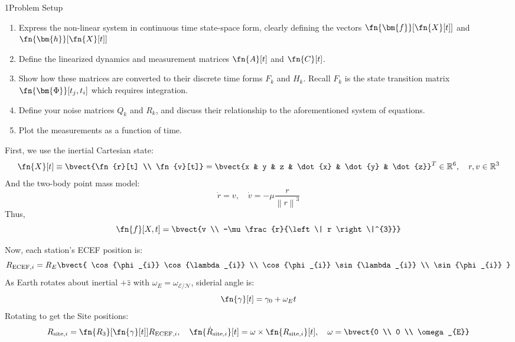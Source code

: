 \begin{hwkProblem}{1}{Problem Setup} \label{hwk:p01}

	\begin{enumerate}[label=\alph*.]
		\item \label{hwk:p01a} Express the non-linear system in continuous time state-space form, clearly defining the vectors \( \fn{\bm{f}}[\fn{X}[t]] \) and \( \fn{\bm{h}}[\fn{X}[t]] \)
		\item \label{hwk:p01b} Define the linearized dynamics and measurement matrices \( \fn{A}[t] \) and \( \fn{C}[t] \).
		\item \label{hwk:p01c} Show how these matrices are converted to their discrete time forms \( F_{k} \) and \( H_{k} \). Recall \( F_{k} \) is the state transition matrix \( \fn{\bm{\Phi}}[t_{j}, t_{i}] \) which requires integration.
		\item \label{hwk:p01d} Define your noise matrices \( Q_{k} \) and \( R_{k} \), and discuss their relationship to the aforementioned system of equations.
		\item \label{hwk:p01e} Plot the measurements as a function of time.
	\end{enumerate}

	\hwkSol{} \label{hwk:s01}

	\hwkPart{} \label{hwk:s01a}

	First, we use the inertial Cartesian state:
	\[
		\fn{X}[t] \equiv \bvect{\fn{r}[t] \\ \fn{v}[t]} = \bvect{x & y & z & \dot{x} & \dot{y} & \dot{z}}^{T} \in \mathbb{R}^{6}, \quad r, v \in \mathbb{R}^{3}
	\]
	And the two-body point mass model:
	\[
		\dot{r} = v, \quad \dot{v} = -\mu \frac{r}{\left\| r \right\|^{3}}
	\]
	Thus,
	\[
		\fn{f}[X, t] = \bvect{v \\ -\mu \frac{r}{\left\| r \right\|^{3}}}
	\]

	Now, each station's ECEF position is:
	\[
		R_{\text{ECEF}, i} = R_{E} \bvect{ \cos{\phi_{i}} \cos{\lambda_{i}} \\ \cos{\phi_{i}} \sin{\lambda_{i}} \\ \sin{\phi_{i}} }
	\]
	As Earth rotates about inertial \( + \hat{z} \) with \( \omega_{E} = \omega_{\mathcal{E}/\mathcal{N}} \), siderial angle is:
	\[
		\fn{\gamma}[t] = \gamma_{0} + \omega_{E} t
	\]
	Rotating to get the Site positions:
	\[
		R_{\text{site}, i} = \fn{R_{3}}[\fn{\gamma}[t]] R_{\text{ECEF}, i}, \quad \fn{\dot{R}_{\text{site}, i}}[t] = \omega \times \fn{R_{\text{site}, i}}[t], \quad \omega = \bvect{0 \\ 0 \\ \omega_{E}}
	\]


\end{hwkProblem}
